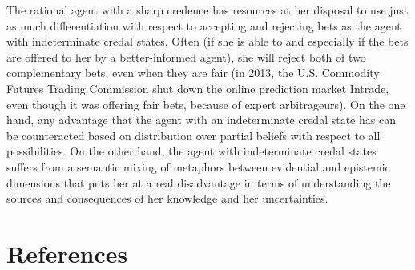 \documentclass[11pt]{article}
\begin{document}
The rational agent with a sharp credence has resources at her disposal
to use just as much differentiation with respect to accepting and
rejecting bets as the agent with indeterminate credal states. Often
(if she is able to and especially if the bets are offered to her by a
better-informed agent), she will reject both of two complementary
bets, even when they are fair (in 2013, the U.S. Commodity Futures
Trading Commission shut down the online prediction market Intrade,
even though it was offering fair bets, because of expert
arbitrageurs). On the one hand, any advantage that the agent with an
indeterminate credal state has can be counteracted based on
distribution over partial beliefs with respect to all possibilities.
On the other hand, the agent with indeterminate credal states suffers
from a semantic mixing of metaphors between evidential and epistemic
dimensions that puts her at a real disadvantage in terms of
understanding the sources and consequences of her knowledge and her
uncertainties.

\section{References} 
\label{References}

\nocite{boole54} 
\nocite{fraassen81} 
 

\end{document}
